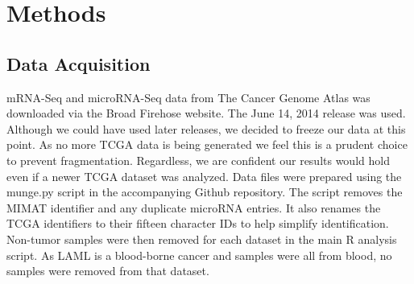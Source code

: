\documentclass[12pt]{report}
\begin{document}



\section*{Methods}
\subsection*{Data Acquisition}
mRNA-Seq and microRNA-Seq data from The Cancer Genome Atlas was downloaded via the Broad Firehose website.
The June 14, 2014 release was used. Although we could have used later releases, we decided to freeze our data at this point. As no more
TCGA data is being generated we feel this is a prudent choice to prevent fragmentation. Regardless, we are confident our results would hold
even if a newer TCGA dataset was analyzed. Data files were prepared using the munge.py script in the accompanying Github repository. The script
removes the MIMAT identifier and any duplicate microRNA entries. It also renames the TCGA identifiers to their fifteen character IDs to help
simplify identification. Non-tumor samples were then removed for each dataset in the main R analysis script. As LAML is a blood-borne cancer and samples were all from blood,
no samples were removed from that dataset.



\end{document}
